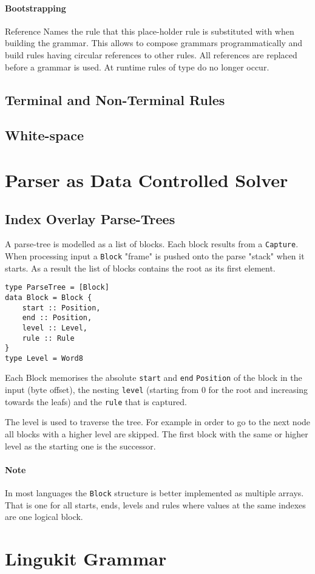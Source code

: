 \documentclass[10pt,a4paper]{article}
\begin{document}
\paragraph{Bootstrapping}
\begin{rulelist}
\item[Reference] Names the rule that this place-holder rule is substituted with when building the grammar. This allows to compose grammars programmatically and build rules having circular references to other rules. All references are replaced before a grammar is used. At runtime rules of type do no longer occur.
\end{rulelist}

\subsection{Terminal and Non-Terminal Rules}

\subsection{White-space}

\section{Parser as Data Controlled Solver}
\subsection{Index Overlay Parse-Trees}
A parse-tree is modelled as a list of blocks. Each block results from a \texttt{Capture}. When processing input a \texttt{Block} "frame" is pushed onto the parse "stack" when it starts. As a result the list of blocks contains the root as its first element. 
\begin{lstlisting}
type ParseTree = [Block]
data Block = Block { 
	start :: Position,
	end :: Position,
	level :: Level,
	rule :: Rule
}
type Level = Word8
\end{lstlisting}
Each Block memorises the absolute \texttt{start} and \texttt{end} \texttt{Position} of the block in the input (byte offset), the nesting \texttt{level} (starting from 0 for the root and increasing towards the leafs) and the \texttt{rule} that is captured. 

The level is used to traverse the tree. For example in order to go to the next node all blocks with a higher level are skipped. The first block with the same or higher level as the starting one is the successor.

\paragraph{Note} In most languages the \texttt{Block} structure is better implemented as multiple arrays. That is one for all starts, ends, levels and rules where values at the same indexes are one logical block.

\section{Lingukit Grammar}


\end{document}
